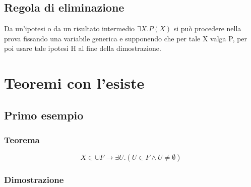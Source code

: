 \documentclass[12pt]{article}
\begin{document}
\subsection{Regola di eliminazione}
Da un'ipotesi o da un risultato intermedio $\exists X.P(X)$ si può procedere nella prova fissando una variabile generica e supponendo che per tale X valga P, per poi usare tale ipotesi H al fine della dimostrazione.
\section{Teoremi con l'esiste}
\subsection{Primo esempio}
\subsubsection{Teorema}
\[
    X \in \cup F \rightarrow \exists U. (U \in F \wedge U \not= \emptyset)
\]
\subsubsection{Dimostrazione}
\end{document}
